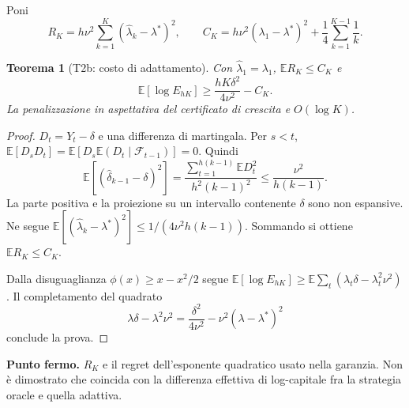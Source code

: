 \documentclass[11pt,a4paper]{article}
\newtheorem{theorem}{Teorema}[section]
\theoremstyle{definition}\newtheorem{definition}[theorem]{Definizione}
\theoremstyle{remark}\newtheorem{remark}[theorem]{Osservazione}
\newcommand{\E}{\mathbb E}\newcommand{\PP}{\mathbb P}\newcommand{\R}{\mathbb R}
\newcommand{\F}{\mathcal F}\newcommand{\W}{\mathcal W}\newcommand{\supp}{\operatorname{supp}}
\newcommand{\important}[1]{\par\smallskip\noindent\colorbox{light}{\parbox{0.963\linewidth}{\textbf{Punto fermo.} #1}}\par\smallskip}
\begin{document}
Poni
\begin{equation}
 R_K=h\nu^2\sum_{k=1}^K(\widehat\lambda_k-\lambda^*)^2,
 \qquad C_K=h\nu^2(\lambda_1-\lambda^*)^2+\frac14\sum_{k=1}^{K-1}\frac1k.
\end{equation}
\begin{theorem}[T2b: costo di adattamento]
Con $\widehat\lambda_1=\lambda_1$, $\E R_K\le C_K$ e
\begin{equation}
 \E[\log E_{hK}]\ge \frac{hK\delta^2}{4\nu^2}-C_K.
\end{equation}
La penalizzazione in aspettativa del certificato di crescita e $O(\log K)$.
\end{theorem}
\begin{proof}
$D_t=Y_t-\delta$ e una differenza di martingala. Per $s<t$, $\E[D_sD_t]=\E[D_s\E(D_t\mid\F_{t-1})]=0$. Quindi
\begin{equation}
 \E[(\widehat\delta_{k-1}-\delta)^2]
 =\frac{\sum_{t=1}^{h(k-1)}\E D_t^2}{h^2(k-1)^2}
 \le\frac{\nu^2}{h(k-1)}.
\end{equation}
La parte positiva e la proiezione su un intervallo contenente $\delta$ sono non espansive. Ne segue
$\E[(\widehat\lambda_k-\lambda^*)^2]\le1/(4\nu^2h(k-1))$. Sommando si ottiene $\E R_K\le C_K$.

Dalla disuguaglianza $\phi(x)\ge x-x^2/2$ segue
$\E[\log E_{hK}]\ge\E\sum_t(\lambda_t\delta-\lambda_t^2\nu^2)$.
Il completamento del quadrato
\begin{equation}
 \lambda\delta-\lambda^2\nu^2=\frac{\delta^2}{4\nu^2}-\nu^2(\lambda-\lambda^*)^2\label{eq:complete}
\end{equation}
conclude la prova.
\end{proof}
\important{$R_K$ e il regret dell'esponente quadratico usato nella garanzia. Non è dimostrato che coincida con la differenza effettiva di log-capitale fra la strategia oracle e quella adattiva.}
\end{document}
